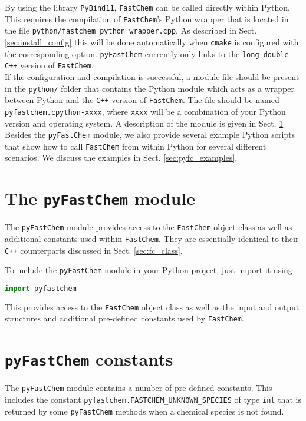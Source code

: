 \documentclass[numbers=noenddot]{aux/fcmanual}
\newcommand{\fc}{\texttt{FastChem}\xspace}
\newcommand{\pfc}{\texttt{pyFastChem}\xspace}
\newcommand{\cpp}{\ttt{C++}\xspace}
\newcommand{\pb}{\texttt{PyBind11}\xspace}
\newcommand{\ttt}[1]{\texttt {#1}}
\begin{document}
By using the library \pb, \fc can be called directly within Python. This requires the compilation of \fc's Python wrapper that is located in the file \verb|python/fastchem_python_wrapper.cpp|. As described in Sect. \ref{sec:install_config} this will be done automatically when \ttt{cmake} is configured with the corresponding option. \pfc currently only links to the \lstinline!long double! \cpp version of \fc. \\
If the configuration and compilation is successful, a module file should be present in the \verb|python/| folder that contains the Python module which acts as a wrapper between Python and the \cpp version of \fc. The file should be named \verb|pyfastchem.cpython-xxxx|, where \verb|xxxx| will be a combination of your Python version and operating system. A description of the module is given in Sect. \ref{sec:pyfc_module} Besides the \pfc module, we also provide several example Python scripts that show how to call \fc from within Python for several different scenarios. We discuss the examples in Sect. \ref{sec:pyfc_examples}.


\section{The \pfc module}
\label{sec:pyfc_module}

The \pfc module provides access to the \fc object class as well as additional constants used within \fc. They are essentially identical to their \cpp counterparts discussed in Sect. \ref{sec:fc_class}.

To include the \pfc module in your Python project, just import it using

\begin{lstlisting}[language=Python]
  import pyfastchem
\end{lstlisting}

This provides access to the \fc object class as well as the input and output structures and additional pre-defined constants used by \fc.

\section{\pfc constants}
\label{sec:pfc_constants}

The \pfc module contains a number of pre-defined constants. This includes the constant \lstinline!pyfastchem.FASTCHEM_UNKNOWN_SPECIES! of type \lstinline!int! that is returned by some \pfc methods when a chemical species is not found. \\
\end{document}
